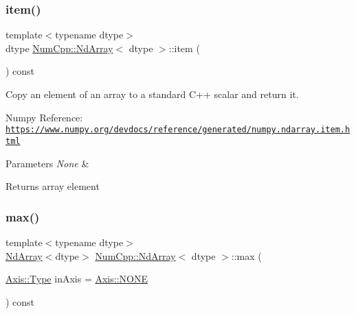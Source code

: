 \subsubsection{\texorpdfstring{item()}{item()}}
{\footnotesize\ttfamily template$<$typename dtype$>$ \\
dtype \mbox{\hyperlink{class_num_cpp_1_1_nd_array}{Num\+Cpp\+::\+Nd\+Array}}$<$ dtype $>$\+::item (\begin{DoxyParamCaption}{ }\end{DoxyParamCaption}) const\hspace{0.3cm}{\ttfamily [inline]}}

Copy an element of an array to a standard C++ scalar and return it.

Numpy Reference\+: \href{https://www.numpy.org/devdocs/reference/generated/numpy.ndarray.item.html}{\tt https\+://www.\+numpy.\+org/devdocs/reference/generated/numpy.\+ndarray.\+item.\+html}


\begin{DoxyParams}{Parameters}
{\em None} & \\
\hline
\end{DoxyParams}
\begin{DoxyReturn}{Returns}
array element 
\end{DoxyReturn}
\mbox{\label{class_num_cpp_1_1_nd_array_a19eaac821a5ce6f9293189d9648e10d0}} 
\subsubsection{\texorpdfstring{max()}{max()}}
{\footnotesize\ttfamily template$<$typename dtype$>$ \\
\mbox{\hyperlink{class_num_cpp_1_1_nd_array}{Nd\+Array}}$<$dtype$>$ \mbox{\hyperlink{class_num_cpp_1_1_nd_array}{Num\+Cpp\+::\+Nd\+Array}}$<$ dtype $>$\+::max (\begin{DoxyParamCaption}\item[{\mbox{\hyperlink{struct_num_cpp_1_1_axis_ac10eb76f8631762d9ed70c40c42ca6cb}{Axis\+::\+Type}}}]{in\+Axis = {\ttfamily \mbox{\hyperlink{struct_num_cpp_1_1_axis_ac10eb76f8631762d9ed70c40c42ca6cba747ae657022cca1d87702b56d0c038e9}{Axis\+::\+N\+O\+NE}}} }\end{DoxyParamCaption}) const\hspace{0.3cm}{\ttfamily [inline]}}

